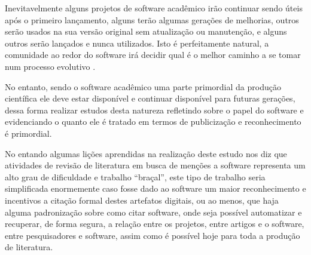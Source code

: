 Inevitavelmente alguns projetos de software acadêmico irão continuar sendo
úteis após o primeiro lançamento, alguns terão algumas gerações de melhorias,
outros serão usados na sua versão original sem atualização ou manutenção, e
alguns outros serão lançados e nunca utilizados. Isto é perfeitamente natural,
a comunidade ao redor do software irá decidir qual é o melhor caminho a se
tomar num processo evolutivo \cite{weiner2009astronomical}.

No entanto, sendo o software acadêmico uma parte primordial da produção
científica ele deve estar disponível e continuar disponível para futuras
gerações, dessa forma realizar estudos desta natureza refletindo sobre
o papel do software e evidenciando o quanto ele é tratado em termos
de publicização e reconhecimento é primordial.

No entando algumas lições aprendidas na realização deste estudo nos diz que
atividades de revisão de literatura em busca de menções a software representa
um alto grau de dificuldade e trabalho ``braçal'', este tipo de trabalho seria
simplificada enormemente caso fosse dado ao software um maior reconhecimento e
incentivos a citação formal destes artefatos digitais, ou ao menos, que haja
alguma padronização sobre como citar software, onde seja possível automatizar e
recuperar, de forma segura, a relação entre os projetos, entre artigos e o
software, entre pesquisadores e software, assim como é possível hoje para toda
a produção de literatura.





